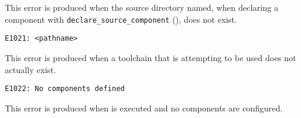 This error is produced when the source directory named, when declaring
a component with \texttt{declare\_source\_component}
(), does not exist.


\begin{verbatim}
E1021: <pathname>
\end{verbatim}

This error is produced when a toolchain that is attempting to be used
does not actually exist.


\begin{verbatim}
E1022: No components defined
\end{verbatim}

This error is produced when \lmsbw is executed and no components are
configured.
